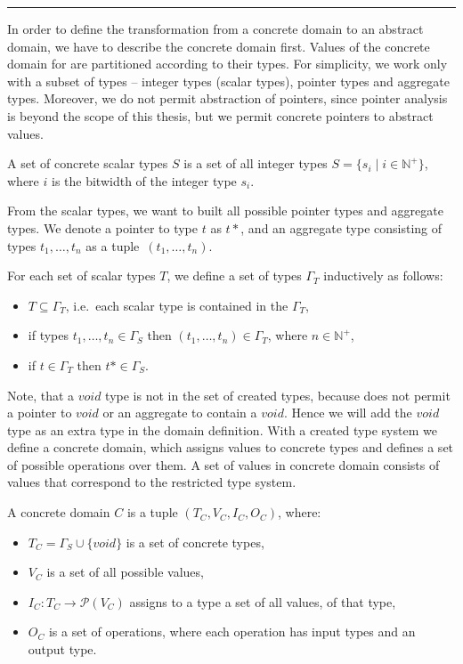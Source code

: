 \hrule

\bigskip

In order to define the transformation from a concrete domain to an abstract
domain, we have to describe the concrete domain first. Values of the concrete
domain for \LLVM are partitioned according to their types. For simplicity, we
work only with a subset of \LLVM types -- integer types (scalar types), pointer
types and aggregate types. Moreover, we do not permit abstraction of pointers,
since pointer analysis is beyond the scope of this thesis, but we permit
concrete pointers to abstract values.
\begin{definition}
A set of concrete scalar types $S$ is a set of all integer types $S = \{
s_i \mid i \in \mathbb{N}^+ \}$, where $i$ is the bitwidth of the integer type
$s_i$.
\end{definition}
From the scalar types, we want to built all possible pointer types and
aggregate types. We denote a pointer to type $t$ as $t*$, and an aggregate type
consisting of types $t_1, \dots, t_n$ as a tuple~$(t_1, \dots, t_n)$.

\begin{definition}
    For each set of scalar types $T$, we define a set of types $\Gamma_T$
    inductively as follows:
    \begin{itemize}
        \item $T \subseteq \Gamma_T$, i.e.~each scalar type is contained in the
            $\Gamma_T$,
        \item if types $t_1, \dots, t_n \in \Gamma_S$ then
            $(t_1, \dots, t_n) \in \Gamma_T$, where $n \in \mathbb{N}^+$,
        \item if $t \in \Gamma_T$ then $t* \in \Gamma_S$.
    \end{itemize}
\end{definition}
Note, that a $void$ type is not in the set of created types, because \LLVM does
not permit a pointer to $void$ or an aggregate to contain a $void$. Hence we
will add the $void$ type as an extra type in the domain definition. With a
created type system we define a concrete domain, which assigns values to
concrete types and defines a set of possible operations over them. A set of
values in concrete domain consists of \LLVM values that correspond to the
restricted type system.
\begin{definition}
    A concrete domain $C$ is a tuple $(T_C, V_C, I_C, O_C)$, where:
    \begin{itemize}
        \item $T_C = \Gamma_S \cup \{ void \}$ is a set of concrete types,
        \item $V_C$ is a set of all possible \LLVM values,
        \item $I_C \colon T_C \to \mathcal{P}(V_C)$ assigns to a type a set of
            all values, of that type,
        \item $O_C$ is a set of \LLVM operations, where each operation has
            input types and an output type.
    \end{itemize}
\end{definition}

